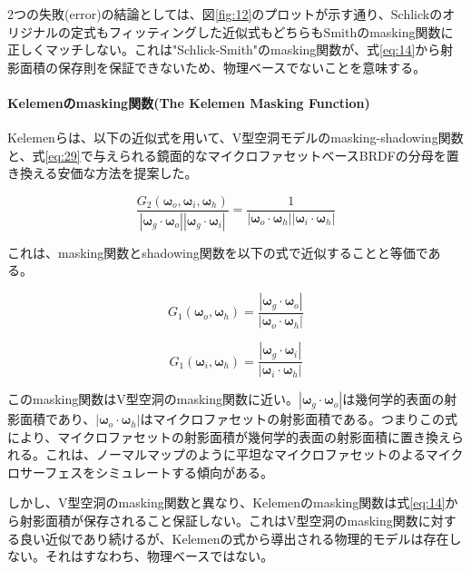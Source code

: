 \documentclass[a4j,xelatex,ja=standard]{bxjsarticle}
\begin{document}
2つの失敗(error)の結論としては、図\ref{fig:12}のプロットが示す通り、Schlickのオリジナルの定式もフィッティングした近似式もどちらもSmithのmasking関数に正しくマッチしない。これは"Schlick-Smith"のmasking関数が、式\ref{eq:14}から射影面積の保存則を保証できないため、物理ベースでないことを意味する。

\paragraph{Kelemenのmasking関数(The Kelemen Masking Function)}

Kelemenらは、以下の近似式を用いて、V型空洞モデルのmasking-shadowing関数と、式\eqref{eq:29}で与えられる鏡面的なマイクロファセットベースBRDFの分母を置き換える安価な方法を提案した。

\begin{equation}
    \frac{G_2(\boldsymbol{\omega}_o, \boldsymbol{\omega}_i, \boldsymbol{\omega}_h)}{|\boldsymbol{\omega}_g \cdot \boldsymbol{\omega}_o| |\boldsymbol{\omega}_g \cdot \boldsymbol{\omega}_i|} = \frac{1}{|\boldsymbol{\omega}_o \cdot \boldsymbol{\omega}_h| |\boldsymbol{\omega}_i \cdot \boldsymbol{\omega}_h|}
    \label{eq:58}
\end{equation}

これは、masking関数とshadowing関数を以下の式で近似することと等価である。

\begin{equation}
    G_1(\boldsymbol{\omega}_o, \boldsymbol{\omega}_h) = \frac{|\boldsymbol{\omega}_g \cdot \boldsymbol{\omega}_o|}{|\boldsymbol{\omega}_o \cdot \boldsymbol{\omega}_h|}
    \label{eq:59}
\end{equation}

\begin{equation}
    G_1(\boldsymbol{\omega}_i, \boldsymbol{\omega}_h) = \frac{|\boldsymbol{\omega}_g \cdot \boldsymbol{\omega}_i|}{|\boldsymbol{\omega}_i \cdot \boldsymbol{\omega}_h|}
    \label{eq:60}
\end{equation}

このmasking関数はV型空洞のmasking関数に近い。$|\boldsymbol{\omega}_g \cdot \boldsymbol{\omega}_o|$は幾何学的表面の射影面積であり、$|\boldsymbol{\omega}_o \cdot \boldsymbol{\omega}_h|$はマイクロファセットの射影面積である。つまりこの式により、マイクロファセットの射影面積が幾何学的表面の射影面積に置き換えられる。これは、ノーマルマップのように平坦なマイクロファセットのよるマイクロサーフェスをシミュレートする傾向がある。

しかし、V型空洞のmasking関数と異なり、Kelemenのmasking関数は式\eqref{eq:14}から射影面積が保存されること保証しない。これはV型空洞のmasking関数に対する良い近似であり続けるが、Kelemenの式から導出される物理的モデルは存在しない。それはすなわち、物理ベースではない。
\end{document}

